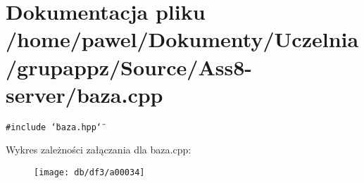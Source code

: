 \hypertarget{a00006}{
\section{Dokumentacja pliku /home/pawel/Dokumenty/Uczelnia/grupappz/Source/Ass8-server/baza.cpp}
\label{de/d21/a00006}
}
{\tt \#include \char`\"{}baza.hpp\char`\"{}}\par


Wykres zależności załączania dla baza.cpp:\nopagebreak
\begin{figure}[H]
\begin{center}
\leavevmode
\texttt{[image: db/df3/a00034]}
\end{center}
\end{figure}
